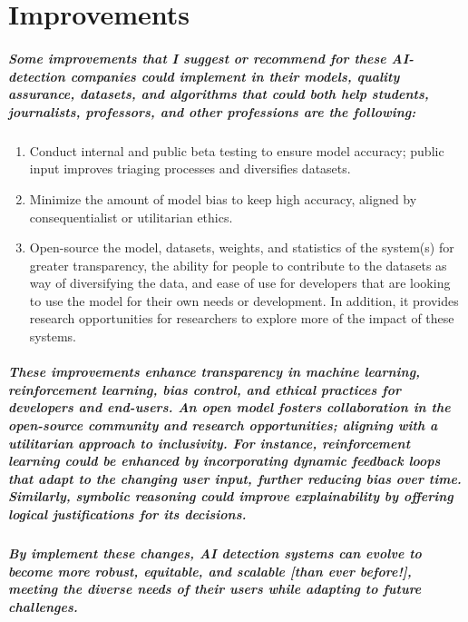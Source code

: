 \documentclass[12pt,letterpaper,final]{report}
\begin{document}
\chapter{Improvements}
\paragraph{
Some improvements that I suggest or recommend for these AI-detection companies could implement in their models, quality assurance, datasets, and algorithms that could both help students, journalists, professors, and other professions are the following:
}

\begin{enumerate}
\item Conduct internal and public beta testing to ensure model accuracy; public input improves triaging processes and diversifies datasets.
\item Minimize the amount of model bias to keep high accuracy, aligned by consequentialist or utilitarian ethics.
\item Open-source the model, datasets, weights, and statistics of the system(s) for greater transparency, the ability for people to contribute to the datasets as way of diversifying the data, and ease of use for developers that are looking to use the model for their own needs or development. In addition, it provides research opportunities for researchers to explore more of the impact of these systems.
\end{enumerate}
\paragraph{
These improvements enhance transparency in machine learning, reinforcement learning, bias control, and ethical practices for developers and end-users. An open model fosters collaboration in the open-source community and research opportunities; aligning with a utilitarian approach to inclusivity. For instance, reinforcement learning could be enhanced by incorporating dynamic feedback loops that adapt to the changing user input, further reducing bias over time. Similarly, symbolic reasoning could improve explainability by offering logical justifications for its decisions.
}
\paragraph{
By implement these changes, AI detection systems can evolve to become more robust, equitable, and scalable [than ever before!], meeting the diverse needs of their users while adapting to future challenges.
}
\end{document}

